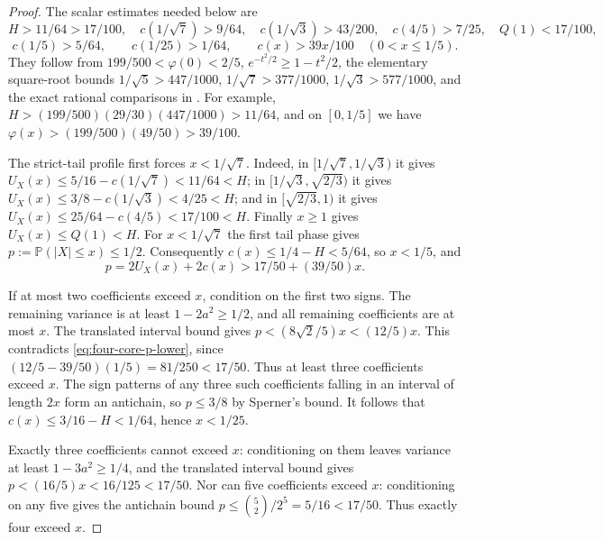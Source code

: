 \documentclass[11pt]{article}
\theoremstyle{remark}\newtheorem{remark}[theorem]{Remark}
\newcommand{\Pp}{\mathbb P}
\begin{document}
\begin{proof}
The scalar estimates needed below are
\[
 H>11/64>17/100,\quad c(1/\sqrt7)>9/64,\quad
 c(1/\sqrt3)>43/200,\quad c(4/5)>7/25,\quad Q(1)<17/100,
\]
\[
 c(1/5)>5/64,\qquad c(1/25)>1/64,\qquad
 c(x)>39x/100\quad(0<x\le1/5).
\]
They follow from $199/500<\varphi(0)<2/5$,
$e^{-t^2/2}\ge1-t^2/2$, the elementary square-root bounds
$1/\sqrt5>447/1000$, $1/\sqrt7>377/1000$,
$1/\sqrt3>577/1000$, and the exact rational comparisons in
. For example,
$H>(199/500)(29/30)(447/1000)>11/64$, and on $[0,1/5]$
we have $\varphi(x)>(199/500)(49/50)>39/100$.

The strict-tail profile first forces $x<1/\sqrt7$. Indeed, in
$[1/\sqrt7,1/\sqrt3)$ it gives
$U_X(x)\le5/16-c(1/\sqrt7)<11/64<H$; in
$[1/\sqrt3,\sqrt{2/3})$ it gives
$U_X(x)\le3/8-c(1/\sqrt3)<4/25<H$; and in
$[\sqrt{2/3},1)$ it gives
$U_X(x)\le25/64-c(4/5)<17/100<H$. Finally $x\ge1$
gives $U_X(x)\le Q(1)<H$.
For $x<1/\sqrt7$ the first tail phase gives
$p:=\Pp(|X|\le x)\le1/2$. Consequently
$c(x)\le1/4-H<5/64$, so $x<1/5$, and
\begin{equation}\label{eq:four-core-p-lower}
 p=2U_X(x)+2c(x)>17/50+(39/50)x.
\end{equation}

If at most two coefficients exceed $x$, condition on the first two
signs. The remaining variance is at least $1-2a^2\ge1/2$, and
all remaining coefficients are at most $x$. The translated interval
bound gives
$p<(8\sqrt2/5)x<(12/5)x$. This contradicts
\eqref{eq:four-core-p-lower}, since
$(12/5-39/50)(1/5)=81/250<17/50$.
Thus at least three coefficients exceed $x$. The sign patterns of
any three such coefficients falling in an interval of length $2x$
form an antichain, so $p\le3/8$ by Sperner's bound.
It follows that $c(x)\le3/16-H<1/64$, hence $x<1/25$.

Exactly three coefficients cannot exceed $x$: conditioning on them
leaves variance at least $1-3a^2\ge1/4$, and the translated interval
bound gives $p<(16/5)x<16/125<17/50$.
Nor can five coefficients exceed $x$: conditioning on any five gives
the antichain bound $p\le\binom52/2^5=5/16<17/50$.
Thus exactly four exceed $x$.


\end{proof}
\end{document}
